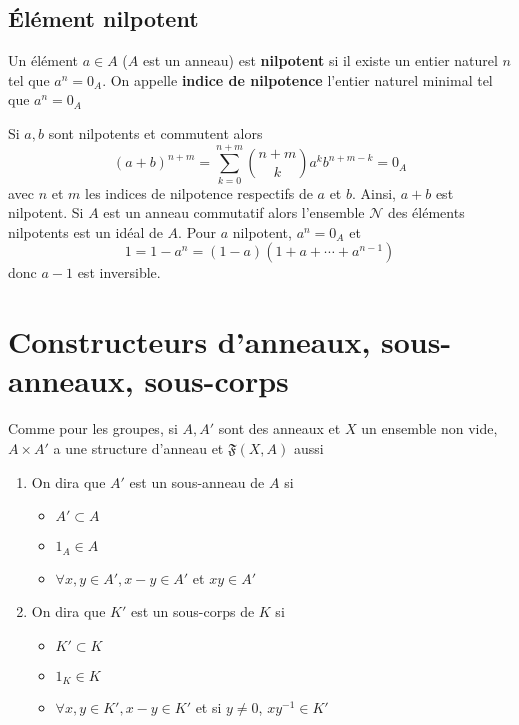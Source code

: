 \subsection{Élément nilpotent}

\begin{dfn}
    Un élément $a\in A$ ($A$ est un anneau) est \textbf{nilpotent} si il existe un entier naturel $n$ tel que $a^n=0_A$. On appelle \textbf{indice de nilpotence} l'entier naturel minimal tel que $a^n=0_A$
\end{dfn}

Si $a, b$ sont nilpotents et commutent alors \[
    (a+b)^{n+m}=\sum_{k=0}^{n+m}\binom{n+m}k a^kb^{n+m-k}=0_A
\]
avec $n$ et $m$ les indices de nilpotence respectifs de $a$ et $b$. Ainsi, $a+b$ est nilpotent. Si $A$ est un anneau commutatif alors l'ensemble $\mathcal N$ des éléments nilpotents est un idéal de $A$. Pour $a$ nilpotent, $a^n=0_A$ et \[
    1=1-a^n=(1-a)(1+a+\cdots +a^{n-1})
\]
donc $a-1$ est inversible.

\section{Constructeurs d'anneaux, sous-anneaux, sous-corps}

Comme pour les groupes, si $A, A'$ sont des anneaux et $X$ un ensemble non vide, $A\times A'$ a une structure d'anneau et $\mathfrak F(X, A)$ aussi

\begin{defprop}
    \begin{enumerate}
        \item On dira que $A'$ est un sous-anneau de $A$ si \begin{itemize}
            \item $A'\subset A$
            \item $1_A\in A$
            \item $\forall x, y\in A', x-y\in A'$ et $xy\in A'$
        \end{itemize}
    \item On dira que $K'$ est un sous-corps de $K$ si \begin{itemize}
        \item $K'\subset K$
        \item $1_K\in K$
        \item $\forall x, y\in K', x-y\in K'$ et si $y\neq 0$, $xy^{-1}\in K'$
    \end{itemize}
    \end{enumerate}
\end{defprop}

